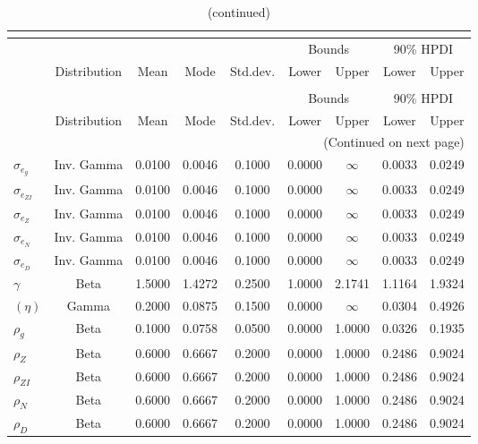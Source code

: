  
\begin{center}
\begin{longtable}{lcccccccc} 
\caption{Prior information (parameters)}\\
 \label{Table:Prior}\\
\toprule%
  &  &  &  &  & \multicolumn{2}{c}{Bounds} & \multicolumn{2}{c}{90\% HPDI} \\ 
  \cmidrule(r{.75em}){6-7} \cmidrule(r{.75em}){8-9}
  & Distribution & Mean & Mode & Std.dev. & Lower & Upper & Lower & Upper  \\ 
\midrule
\endfirsthead
\caption{(continued)}\\
 \toprule%
  &  &  &  &  & \multicolumn{2}{c}{Bounds} & \multicolumn{2}{c}{90\% HPDI} \\ 
  \cmidrule(r{.75em}){6-7} \cmidrule(r{.75em}){8-9}
  & Distribution & Mean & Mode & Std.dev. & Lower & Upper & Lower & Upper  \\ 
\midrule
\endhead
\midrule
\multicolumn{9}{r}{(Continued on next page)} \\ 
\bottomrule
\endfoot
\bottomrule
\endlastfoot
$ \sigma_{{e_g}} $ & Inv. Gamma & 0.0100 & 0.0046 & 0.1000 & 0.0000 & $\infty$ & 0.0033 & 0.0249 \\ 
$ \sigma_{{e_{ZI}}} $ & Inv. Gamma & 0.0100 & 0.0046 & 0.1000 & 0.0000 & $\infty$ & 0.0033 & 0.0249 \\ 
$ \sigma_{{e_Z}} $ & Inv. Gamma & 0.0100 & 0.0046 & 0.1000 & 0.0000 & $\infty$ & 0.0033 & 0.0249 \\ 
$ \sigma_{{e_N}} $ & Inv. Gamma & 0.0100 & 0.0046 & 0.1000 & 0.0000 & $\infty$ & 0.0033 & 0.0249 \\ 
$ \sigma_{{e_D}} $ & Inv. Gamma & 0.0100 & 0.0046 & 0.1000 & 0.0000 & $\infty$ & 0.0033 & 0.0249 \\ 
$ {\gamma} $ & Beta & 1.5000 & 1.4272 & 0.2500 & 1.0000 & 2.1741 & 1.1164 & 1.9324 \\ 
$ (\eta) $ & Gamma & 0.2000 & 0.0875 & 0.1500 & 0.0000 & $\infty$ & 0.0304 & 0.4926 \\ 
$ {\rho_g} $ & Beta & 0.1000 & 0.0758 & 0.0500 & 0.0000 & 1.0000 & 0.0326 & 0.1935 \\ 
$ {\rho_Z} $ & Beta & 0.6000 & 0.6667 & 0.2000 & 0.0000 & 1.0000 & 0.2486 & 0.9024 \\ 
$ {\rho_{ZI}} $ & Beta & 0.6000 & 0.6667 & 0.2000 & 0.0000 & 1.0000 & 0.2486 & 0.9024 \\ 
$ {\rho_N} $ & Beta & 0.6000 & 0.6667 & 0.2000 & 0.0000 & 1.0000 & 0.2486 & 0.9024 \\ 
$ {\rho_D} $ & Beta & 0.6000 & 0.6667 & 0.2000 & 0.0000 & 1.0000 & 0.2486 & 0.9024 \\ 
\end{longtable}
 \end{center}
